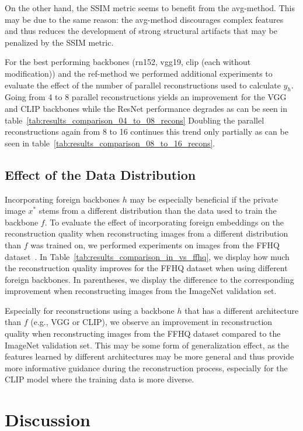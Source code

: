 \documentclass[10pt,twocolumn]{article}
\begin{document}
On the other hand, the SSIM metric seems to benefit from the avg-method.
This may be due to the same reason: the avg-method discourages complex features and thus reduces the development of strong structural artifacts that may be penalized by the SSIM metric.

For the best performing backbones (rn152, vgg19, clip (each without modification)) and the ref-method we performed additional experiments to evaluate the effect of the number of parallel reconstructions used to calculate $y_h$.
Going from 4 to 8 parallel reconstructions yields an improvement for the VGG and CLIP backbones while the ResNet performance degrades as can be seen in table~\ref{tab:results_comparison_04_to_08_recons}
Doubling the parallel reconstructions again from 8 to 16 continues this trend only partially as can be seen in table~\ref{tab:results_comparison_08_to_16_recons}.

\subsection{Effect of the Data Distribution}
Incorporating foreign backbones $h$ may be especially beneficial if the private image $x^*$ stems from a different distribution than the data used to train the backbone $f$.
To evaluate the effect of incorporating foreign embeddings on the reconstruction quality when reconstructing images from a different distribution than $f$ was trained on, we performed experiments on images from the FFHQ dataset~\cite{karras2019style}.
In Table~\ref{tab:results_comparison_in_vs_ffhq}, we display how much the reconstruction quality improves for the FFHQ dataset when using different foreign backbones.
In parentheses, we display the difference to the corresponding improvement when reconstructing images from the ImageNet validation set.

Especially for reconstructions using a backbone $h$ that has a different architecture than $f$ (e.g., VGG or CLIP), we observe an improvement in reconstruction quality when reconstructing images from the FFHQ dataset compared to the ImageNet validation set.
This may be some form of generalization effect, as the features learned by different architectures may be more general and thus provide more informative guidance during the reconstruction process, especially for the CLIP model where the training data is more diverse.
\section{Discussion}
\end{document}
